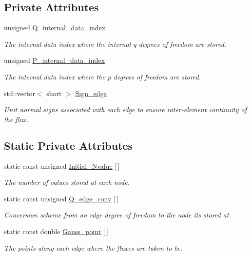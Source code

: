 \subsection*{Private Attributes}
\begin{DoxyCompactItemize}
\item 
unsigned \hyperlink{classoomph_1_1TPoroelasticityElement_a1f6d34cb8d26fb7d82e4fbd1a7a7c9a3}{Q\+\_\+internal\+\_\+data\+\_\+index}
\begin{DoxyCompactList}\small\item\em The internal data index where the internal q degrees of freedom are stored. \end{DoxyCompactList}\item 
unsigned \hyperlink{classoomph_1_1TPoroelasticityElement_a982e6e841b2bc2ab02526916dbc77ca8}{P\+\_\+internal\+\_\+data\+\_\+index}
\begin{DoxyCompactList}\small\item\em The internal data index where the p degrees of freedom are stored. \end{DoxyCompactList}\item 
std\+::vector$<$ short $>$ \hyperlink{classoomph_1_1TPoroelasticityElement_a350907258dbb3be942c027db0090e7b3}{Sign\+\_\+edge}
\begin{DoxyCompactList}\small\item\em Unit normal signs associated with each edge to ensure inter-\/element continuity of the flux. \end{DoxyCompactList}\end{DoxyCompactItemize}
\subsection*{Static Private Attributes}
\begin{DoxyCompactItemize}
\item 
static const unsigned \hyperlink{classoomph_1_1TPoroelasticityElement_aa906a23cadc727176f0373923dde01f1}{Initial\+\_\+\+Nvalue} \mbox{[}$\,$\mbox{]}
\begin{DoxyCompactList}\small\item\em The number of values stored at each node. \end{DoxyCompactList}\item 
static const unsigned \hyperlink{classoomph_1_1TPoroelasticityElement_a233a15513d26988887d35cbcaa517a0b}{Q\+\_\+edge\+\_\+conv} \mbox{[}$\,$\mbox{]}
\begin{DoxyCompactList}\small\item\em Conversion scheme from an edge degree of freedom to the node it\textquotesingle{}s stored at. \end{DoxyCompactList}\item 
static const double \hyperlink{classoomph_1_1TPoroelasticityElement_a57b72b30d03fd2c5ca6da2f31d10fe97}{Gauss\+\_\+point} \mbox{[}$\,$\mbox{]}
\begin{DoxyCompactList}\small\item\em The points along each edge where the fluxes are taken to be. \end{DoxyCompactList}\end{DoxyCompactItemize}
